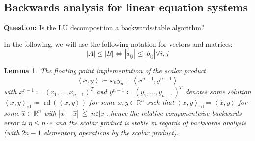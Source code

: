 \documentclass[a4paper]{article}
\newcounter{lecref}[section]
\numberwithin{lecref}{section}
\theoremstyle{break}
\newtheorem{lemma}[lecref]{Lemma}
\newcommand{\Abs}[1]{\left|#1\right|}
\newcommand{\IP}[2]{\left\langle#1, #2\right\rangle}
\newcommand{\dotted}[1]{\:\dot{#1}\:}  %
\begin{document}
\subsection{Backwards analysis for linear equation systems}
\label{sec:2-4}

\textbf{Question:} Is the LU decomposition a backwardsstable algorithm?

In the following, we will use the following notation for vectors and matrices:
\[ \Abs{A} \leq \Abs{B} \iff \Abs{a_{ij}} \leq \Abs{b_{ij}} \forall i,j \]

\begin{lemma}
  \label{lemma:2-16}
  The floating point implementation of the scalar product
  \[ \IP{x}{y} \coloneqq x_n y_n + \IP{x^{n-1}}{y^{n-1}} \]
  with $x^{n-1} \coloneqq (x_1, \dots, x_{n-1})^T$ and $y^{n-1} \coloneqq (y_1, \dots, y_{n-1})^T$
  denotes some solution $\IP{x}{y}_{\text{rd}} \coloneqq \operatorname{rd}(\IP{x}{y})$ for some $x, y \in \mathbb R^n$
  such that $\IP{x}{y}_{\operatorname{rd}} = \IP{\hat{x}}{y}$ for some $\hat{x} \in \mathbb R^n$ with $\Abs{x - \hat{x}} \dotted{\leq} n \varepsilon \Abs{x}$,
  hence the relative componentwise backwards error is $\eta \leq n \cdot \varepsilon$
  and the scalar product is stable in regards of backwards analysis (with $2n-1$ elementary operations by the scalar product). %
\end{lemma}
\end{document}

